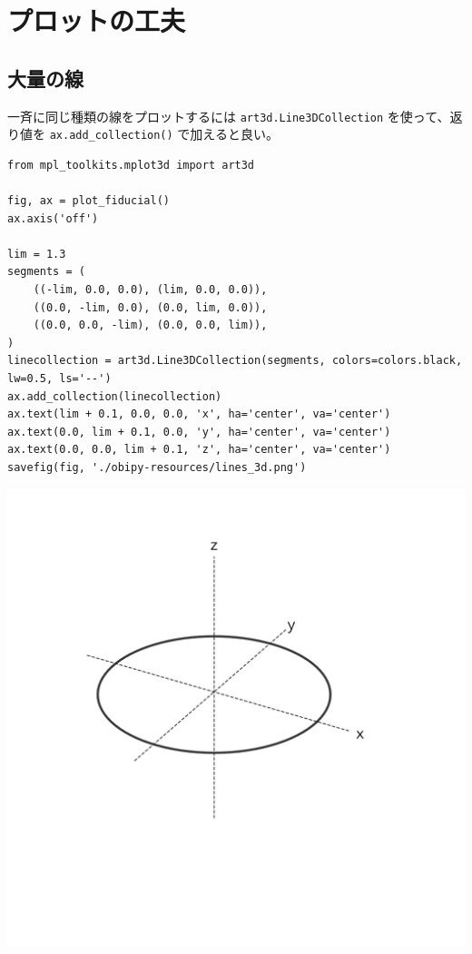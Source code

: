 \documentclass[a4paper, 10pt, notitlepage, twocolumn, uplatex, oneside, dvipdfmx]{jsarticle}
\begin{document}
\section{プロットの工夫}
\label{sec:org00a224b}
\subsection{大量の線}
\label{sec:org400d12b}
一斉に同じ種類の線をプロットするには \texttt{art3d.Line3DCollection} を使って、返り値を \texttt{ax.add\_collection()} で加えると良い。
\begin{verbatim}
from mpl_toolkits.mplot3d import art3d

fig, ax = plot_fiducial()
ax.axis('off')

lim = 1.3
segments = (
    ((-lim, 0.0, 0.0), (lim, 0.0, 0.0)),
    ((0.0, -lim, 0.0), (0.0, lim, 0.0)),
    ((0.0, 0.0, -lim), (0.0, 0.0, lim)),
)
linecollection = art3d.Line3DCollection(segments, colors=colors.black, lw=0.5, ls='--')
ax.add_collection(linecollection)
ax.text(lim + 0.1, 0.0, 0.0, 'x', ha='center', va='center')
ax.text(0.0, lim + 0.1, 0.0, 'y', ha='center', va='center')
ax.text(0.0, 0.0, lim + 0.1, 'z', ha='center', va='center')
savefig(fig, './obipy-resources/lines_3d.png')
\end{verbatim}

\label{}
\begin{center}
\includegraphics[width=1.0\linewidth]{./obipy-resources/lines_3d.png}
\end{center}
\end{document}
